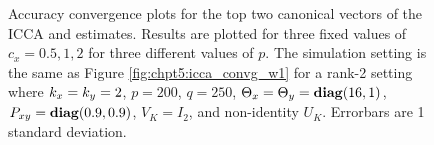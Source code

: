 \begin{figure}
\begin{center}
{    }
    \caption{Accuracy convergence plots for the top two canonical vectors of the ICCA
      and \iccap estimates. Results are plotted for three fixed values of $c_x=0.5,1,2$
      for three different values of $p$. The simulation setting is the same as Figure
      \ref{fig:chpt5:icca_convg_w1} for a rank-2 setting where $k_x=k_y=2$, $p=200$,
      $q=250$, $\Theta_x=\Theta_y=\mathop{\bf diag}(16,1)$, $P_{xy}=\mathop{\bf diag}(0.9,0.9)$, $V_K=I_2$, and non-identity
      $U_K$. Errorbars are 1 standard deviation.}
    \label{fig:chpt5:icca_vect_convg1}
  \end{center}
\end{figure}
\begin{figure}
  \begin{center}
\end{center}
\end{figure}
